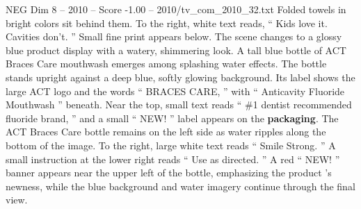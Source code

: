 \begin{textsample}{NEG Dim 8 – 2010 – Score -1.00 – 2010/tv\_com\_2010\_32.txt}
Folded towels in bright colors sit behind them.
To the right, white text reads, “ Kids love it.
Cavities don't. ” Small fine print appears below.
The scene changes to a glossy blue product display with a watery, shimmering look.
A tall blue bottle of ACT Braces Care mouthwash emerges among splashing water effects.
The bottle stands upright against a deep blue, softly glowing background.
Its label shows the large ACT logo and the words “ BRACES CARE, ” with “ Anticavity Fluoride Mouthwash ” beneath.
Near the top, small text reads “ \#1 dentist recommended fluoride brand, ” and a small “ NEW! ” label appears on the \textbf{packaging}.
The ACT Braces Care bottle remains on the left side as water ripples along the bottom of the image.
To the right, large white text reads “ Smile Strong. ” A small instruction at the lower right reads “ Use as directed. ” A red “ NEW! ” banner appears near the upper left of the bottle, emphasizing the product ’s newness, while the blue background and water imagery continue through the final view.

\end{textsample}
